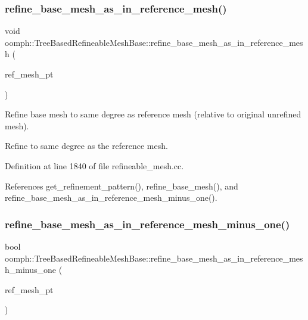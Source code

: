 \subsubsection{\texorpdfstring{refine\+\_\+base\+\_\+mesh\+\_\+as\+\_\+in\+\_\+reference\+\_\+mesh()}{refine\_base\_mesh\_as\_in\_reference\_mesh()}}
{\footnotesize\ttfamily void oomph\+::\+Tree\+Based\+Refineable\+Mesh\+Base\+::refine\+\_\+base\+\_\+mesh\+\_\+as\+\_\+in\+\_\+reference\+\_\+mesh (\begin{DoxyParamCaption}\item[{\hyperlink{classoomph_1_1TreeBasedRefineableMeshBase}{Tree\+Based\+Refineable\+Mesh\+Base} $\ast$const \&}]{ref\+\_\+mesh\+\_\+pt }\end{DoxyParamCaption})\hspace{0.3cm}{\ttfamily [virtual]}}



Refine base mesh to same degree as reference mesh (relative to original unrefined mesh). 

Refine to same degree as the reference mesh. 

Definition at line 1840 of file refineable\+\_\+mesh.\+cc.



References get\+\_\+refinement\+\_\+pattern(), refine\+\_\+base\+\_\+mesh(), and refine\+\_\+base\+\_\+mesh\+\_\+as\+\_\+in\+\_\+reference\+\_\+mesh\+\_\+minus\+\_\+one().

\mbox{\label{classoomph_1_1TreeBasedRefineableMeshBase_ae6fc7cc7acf368423cc49cc10ab276bc}} 
\subsubsection{\texorpdfstring{refine\+\_\+base\+\_\+mesh\+\_\+as\+\_\+in\+\_\+reference\+\_\+mesh\+\_\+minus\+\_\+one()}{refine\_base\_mesh\_as\_in\_reference\_mesh\_minus\_one()}}
{\footnotesize\ttfamily bool oomph\+::\+Tree\+Based\+Refineable\+Mesh\+Base\+::refine\+\_\+base\+\_\+mesh\+\_\+as\+\_\+in\+\_\+reference\+\_\+mesh\+\_\+minus\+\_\+one (\begin{DoxyParamCaption}\item[{\hyperlink{classoomph_1_1TreeBasedRefineableMeshBase}{Tree\+Based\+Refineable\+Mesh\+Base} $\ast$const \&}]{ref\+\_\+mesh\+\_\+pt }\end{DoxyParamCaption})\hspace{0.3cm}{\ttfamily [virtual]}}




